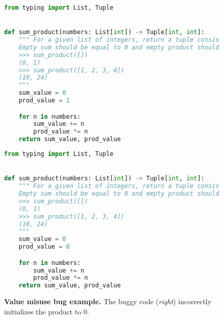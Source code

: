 \begin{figure}[htbp]
\centering
\begin{minipage}{0.45\textwidth}
\begin{lstlisting}[language=Python,breaklines=true,basicstyle=\ttfamily\scriptsize]
from typing import List, Tuple


def sum_product(numbers: List[int]) -> Tuple[int, int]:
    """ For a given list of integers, return a tuple consisting of a sum and a product of all the integers in a list.
    Empty sum should be equal to 0 and empty product should be equal to 1.
    >>> sum_product([])
    (0, 1)
    >>> sum_product([1, 2, 3, 4])
    (10, 24)
    """
    sum_value = 0
    prod_value = 1

    for n in numbers:
        sum_value += n
        prod_value *= n
    return sum_value, prod_value
\end{lstlisting}
\end{minipage}\hfill
\begin{minipage}{0.45\textwidth}
\begin{lstlisting}[language=Python,breaklines=true,basicstyle=\ttfamily\scriptsize]
from typing import List, Tuple


def sum_product(numbers: List[int]) -> Tuple[int, int]:
    """ For a given list of integers, return a tuple consisting of a sum and a product of all the integers in a list.
    Empty sum should be equal to 0 and empty product should be equal to 1.
    >>> sum_product([])
    (0, 1)
    >>> sum_product([1, 2, 3, 4])
    (10, 24)
    """
    sum_value = 0
    prod_value = 0

    for n in numbers:
        sum_value += n
        prod_value *= n
    return sum_value, prod_value
\end{lstlisting}
\end{minipage}
\caption{\textbf{Value misuse bug example.} The buggy code (\emph{right}) incorrectly initializes the product to 0.}
\label{fig:valuemisuse}
\end{figure}

